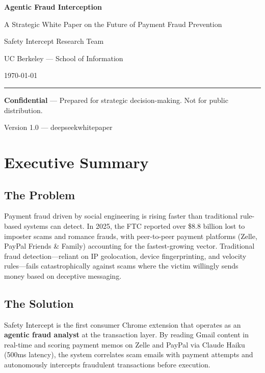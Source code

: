 \documentclass[12pt]{article}
\begin{document}
\begin{titlepage}
    \centering
    \vspace*{2cm}
    {\Huge\bfseries Agentic Fraud Interception\par}
    \vspace{0.5cm}
    {\Large A Strategic White Paper on the Future of Payment Fraud Prevention\par}
    \vspace{2cm}
    {\large Safety Intercept Research Team\par}
    \vspace{0.5cm}
    {\large UC Berkeley — School of Information\par}
    \vspace{1cm}
    {\large \today\par}
    \vspace{2cm}
    \rule{0.8\textwidth}{0.4pt}
    \vspace{0.5cm}
    {\footnotesize \textbf{Confidential} — Prepared for strategic decision-making. Not for public distribution.\par}
    \vfill
    {\footnotesize Version 1.0 — deepseekwhitepaper}
\end{titlepage}

\tableofcontents
\newpage

\section{Executive Summary}

\subsection{The Problem}
Payment fraud driven by social engineering is rising faster than traditional rule-based systems can detect. In 2025, the FTC reported over \$8.8 billion lost to imposter scams and romance frauds, with peer-to-peer payment platforms (Zelle, PayPal Friends \& Family) accounting for the fastest-growing vector. Traditional fraud detection—reliant on IP geolocation, device fingerprinting, and velocity rules—fails catastrophically against scams where the victim willingly sends money based on deceptive messaging.

\subsection{The Solution}
Safety Intercept is the first consumer Chrome extension that operates as an \textbf{agentic fraud analyst} at the transaction layer. By reading Gmail content in real-time and scoring payment memos on Zelle and PayPal via Claude Haiku (500ms latency), the system correlates scam emails with payment attempts and autonomously intercepts fraudulent transactions before execution.
\end{document}
